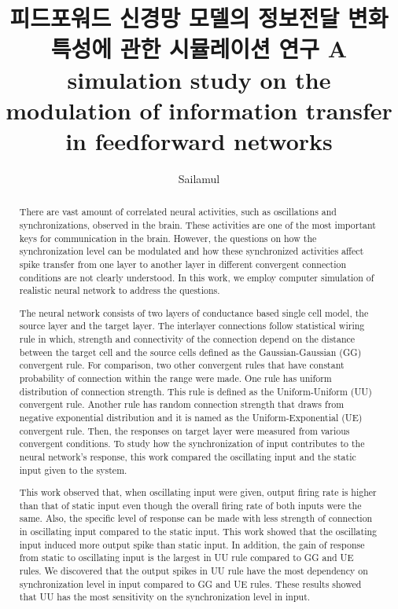 \documentclass[master,english,final]{kaist-ucs}
\title[korean] {피드포워드 신경망 모델의 정보전달 변화 특성에 관한 시뮬레이션 연구}
\title[english]{ A simulation study on the modulation of \linebreak 
information transfer in feedforward networks}
\author[korean] {}{}
\author[chinese]{}{}
\author[english]{Sailamul}{Pachaya}
\begin{document}

    \begin{abstract}
   
There are vast amount of correlated neural activities, such as oscillations and synchronizations, observed in the brain. These activities are one of the most important keys for communication in the brain. However, the questions on how the synchronization level can be modulated and how these synchronized activities affect spike transfer from one layer to another layer in different convergent connection conditions are not clearly understood. In this work, we employ computer simulation of realistic neural network to address the questions. 

The neural network consists of two layers of conductance based single cell model, the source layer and the target layer. The interlayer connections follow statistical wiring rule in which, strength and connectivity of the connection depend on the distance between the target cell and the source cells defined as the Gaussian-Gaussian (GG) convergent rule. For comparison, two other convergent rules that have constant probability of connection within the range were made. One rule has uniform distribution of connection strength. This rule is defined as the Uniform-Uniform (UU) convergent rule. Another rule has random connection strength that draws from negative exponential distribution and it is named as the Uniform-Exponential (UE) convergent rule. Then, the responses on target layer were measured from various convergent conditions. To study how the synchronization of input contributes to the neural network's response, this work compared the oscillating input and the static input given to the system.

This work observed that, when oscillating input were given, output firing rate is higher than that of static input even though the overall firing rate of both inputs were the same. Also, the specific level of response can be made with less strength of connection in oscillating input compared to the static input. This work showed that the oscillating input induced more output spike than static input. In addition, the gain of response from static to oscillating input is the largest in UU rule compared to GG and UE rules. We discovered that the output spikes in UU rule have the most dependency on synchronization level in input compared to GG and UE rules. These results showed that UU has the most sensitivity on the synchronization level in input.
 

\end{abstract}
\end{document}
